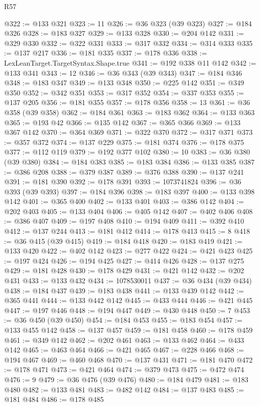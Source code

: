 \begin{lexlean}{R57}
\begin{coremodule}
@322 := @133 @321
@323 := 11
@326 := @36 @323 (@39 @323)
@327 := @184 @326
@328 := @183 @327
@329 := @133 @328
@330 := @204 @142
@331 := @329 @330
@332 := @322 @331
@333 := @317 @332
@334 := @314 @333
@335 := @137 @217
@336 := @181 @335
@337 := @178 @336
@338 := LexLeanTarget.TargetSyntax.Shape.true
@341 := @192 @338 @11 @142
@342 := @133 @341
@343 := 12
@346 := @36 @343 (@39 @343)
@347 := @184 @346
@348 := @183 @347
@349 := @133 @348
@350 := @225 @142
@351 := @349 @350
@352 := @342 @351
@353 := @317 @352
@354 := @337 @353
@355 := @137 @205
@356 := @181 @355
@357 := @178 @356
@358 := 13
@361 := @36 @358 (@39 @358)
@362 := @184 @361
@363 := @183 @362
@364 := @133 @363
@365 := @193 @42
@366 := @135 @142
@367 := @365 @366
@369 := @133 @367 @142
@370 := @364 @369
@371 := @322 @370
@372 := @317 @371
@373 := @357 @372
@374 := @137 @229
@375 := @181 @374
@376 := @178 @375
@377 := @112 @119
@379 := @192 @377 @102
@380 := 10
@383 := @36 @380 (@39 @380)
@384 := @184 @383
@385 := @183 @384
@386 := @133 @385
@387 := @386 @208
@388 := @379 @387
@389 := @376 @388
@390 := @137 @241
@391 := @181 @390
@392 := @178 @391
@393 := 1073741824
@396 := @36 @393 (@39 @393)
@397 := @184 @396
@398 := @183 @397
@400 := @133 @398 @142
@401 := @365 @400
@402 := @133 @401
@403 := @386 @142
@404 := @202 @403
@405 := @133 @404
@406 := @405 @142
@407 := @402 @406
@408 := @386 @407
@409 := @197 @408
@410 := @194 @409
@411 := @392 @410
@412 := @137 @244
@413 := @181 @412
@414 := @178 @413
@415 := 8
@418 := @36 @415 (@39 @415)
@419 := @184 @418
@420 := @183 @419
@421 := @133 @420
@422 := @402 @142
@423 := @277 @422
@424 := @421 @423
@425 := @197 @424
@426 := @194 @425
@427 := @414 @426
@428 := @137 @275
@429 := @181 @428
@430 := @178 @429
@431 := @421 @142
@432 := @202 @431
@433 := @133 @432
@434 := 1078530011
@437 := @36 @434 (@39 @434)
@438 := @184 @437
@439 := @183 @438
@441 := @133 @439 @142
@442 := @365 @441
@444 := @133 @442 @142
@445 := @433 @444
@446 := @421 @445
@447 := @197 @446
@448 := @194 @447
@449 := @430 @448
@450 := 7
@453 := @36 @450 (@39 @450)
@454 := @184 @453
@455 := @183 @454
@457 := @133 @455 @142
@458 := @137 @457
@459 := @181 @458
@460 := @178 @459
@461 := @349 @142
@462 := @202 @461
@463 := @133 @462
@464 := @433 @142
@465 := @463 @464
@466 := @421 @465
@467 := @228 @466
@468 := @194 @467
@469 := @460 @468
@470 := @137 @431
@471 := @181 @470
@472 := @178 @471
@473 := @421 @464
@474 := @379 @473
@475 := @472 @474
@476 := 9
@479 := @36 @476 (@39 @476)
@480 := @184 @479
@481 := @183 @480
@482 := @133 @481
@483 := @482 @142
@484 := @137 @483
@485 := @181 @484
@486 := @178 @485

\end{coremodule}
\end{lexlean}
